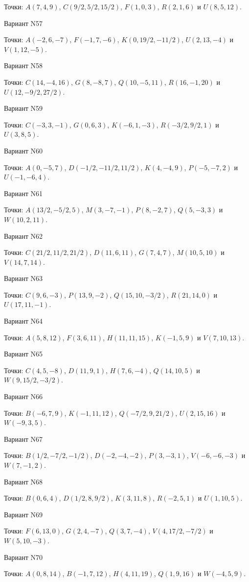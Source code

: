 \documentclass[11pt]{report}
\begin{document}
Точки: $A(7, 4, 9)$, $C(9/2, 5/2, 15/2)$, $F(1, 0, 3)$, $R(2, 1, 6)$ и $U(8, 5, 12)$.

Вариант N57

Точки: $A(-2, 6, -7)$, $F(-1, 7, -6)$, $K(0, 19/2, -11/2)$, $U(2, 13, -4)$ и $V(1, 12, -5)$.

Вариант N58

Точки: $C(14, -4, 16)$, $G(8, -8, 7)$, $Q(10, -5, 11)$, $R(16, -1, 20)$ и $U(12, -9/2, 27/2)$.

Вариант N59

Точки: $C(-3, 3, -1)$, $G(0, 6, 3)$, $K(-6, 1, -3)$, $R(-3/2, 9/2, 1)$ и $U(3, 8, 5)$.

Вариант N60

Точки: $A(0, -5, 7)$, $D(-1/2, -11/2, 11/2)$, $K(4, -4, 9)$, $P(-5, -7, 2)$ и $U(-1, -6, 4)$.

Вариант N61

Точки: $A(13/2, -5/2, 5)$, $M(3, -7, -1)$, $P(8, -2, 7)$, $Q(5, -3, 3)$ и $W(10, 2, 11)$.

Вариант N62

Точки: $C(21/2, 11/2, 21/2)$, $D(11, 6, 11)$, $G(7, 4, 7)$, $M(10, 5, 10)$ и $V(14, 7, 14)$.

Вариант N63

Точки: $C(9, 6, -3)$, $P(13, 9, -2)$, $Q(15, 10, -3/2)$, $R(21, 14, 0)$ и $U(17, 11, -1)$.

Вариант N64

Точки: $A(5, 8, 12)$, $F(3, 6, 11)$, $H(11, 11, 15)$, $K(-1, 5, 9)$ и $V(7, 10, 13)$.

Вариант N65

Точки: $C(4, 5, -8)$, $D(11, 9, 1)$, $H(7, 6, -4)$, $Q(14, 10, 5)$ и $W(9, 15/2, -3/2)$.

Вариант N66

Точки: $B(-6, 7, 9)$, $K(-1, 11, 12)$, $Q(-7/2, 9, 21/2)$, $U(2, 15, 16)$ и $W(-9, 3, 5)$.

Вариант N67

Точки: $B(1/2, -7/2, -1/2)$, $D(-2, -4, -2)$, $P(3, -3, 1)$, $V(-6, -6, -3)$ и $W(7, -1, 2)$.

Вариант N68

Точки: $B(0, 6, 4)$, $D(1/2, 8, 9/2)$, $K(3, 11, 8)$, $R(-2, 5, 1)$ и $U(1, 10, 5)$.

Вариант N69

Точки: $F(6, 13, 0)$, $G(2, 4, -7)$, $Q(3, 7, -4)$, $V(4, 17/2, -7/2)$ и $W(5, 10, -3)$.

Вариант N70

Точки: $A(0, 8, 14)$, $B(-1, 7, 12)$, $H(4, 11, 19)$, $Q(1, 9, 16)$ и $W(-4, 5, 9)$.
\end{document}
